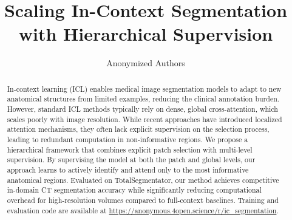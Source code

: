 \documentclass[runningheads]{llncs}
\begin{document}
%
\title{Scaling In-Context Segmentation with Hierarchical Supervision}
%

\author{Anonymized Authors}  %
  
\maketitle              %
%
\begin{abstract}
In-context learning (ICL) enables medical image segmentation models to adapt to new anatomical structures from limited examples, reducing the clinical annotation burden. However, standard ICL methods typically rely on dense, global cross-attention, which scales poorly with image resolution. While recent approaches have introduced localized attention mechanisms, they often lack explicit supervision on the selection process, leading to redundant computation in non-informative regions. We propose a hierarchical framework that combines explicit patch selection with multi-level supervision. By supervising the model at both the patch and global levels, our approach learns to actively identify and attend only to the most informative anatomical regions. Evaluated on TotalSegmentator, our method achieves competitive in-domain CT segmentation accuracy while significantly reducing computational overhead for high-resolution volumes compared to full-context baselines. Training and evaluation code are available at \url{https://anonymous.4open.science/r/ic_segmentation}.


\end{abstract}
\end{document}
